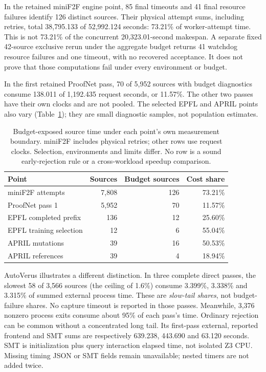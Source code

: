 \documentclass[10pt,twocolumn]{article}
\begin{document}
In the retained miniF2F engine point, 85 final timeouts and 41 final
resource failures identify 126 distinct sources.
Their physical attempt sums, including retries, total 38,795.133 of
52,992.124 seconds: 73.21\% of worker-attempt time.
This is not 73.21\% of the concurrent 20,323.01-second makespan.
A separate fixed 42-source exclusive rerun under the aggregate budget returns
41 watchdog resource failures and one timeout, with no recovered acceptance.
It does not prove that those computations fail under every environment or
budget.

In the first retained ProofNet pass, 70 of 5,952 sources with budget
diagnostics consume 138.011 of 1,192.435 request seconds, or 11.57\%.
The other two passes have their own clocks and are not pooled.
The selected EPFL and APRIL points also vary (Table~\ref{tab:budget});
they are small diagnostic samples, not population estimates.

\begin{table}[t]
\centering\footnotesize
\setlength{\tabcolsep}{3pt}
\begin{tabular}{@{}lrrr@{}}
\toprule
Point & Sources & Budget sources & Cost share\\
\midrule
miniF2F attempts &7,808&126&73.21\%\\
ProofNet pass 1 &5,952&70&11.57\%\\
EPFL completed prefix &136&12&25.60\%\\
EPFL training selection &12&6&55.04\%\\
APRIL mutations &39&16&50.53\%\\
APRIL references &39&4&18.94\%\\
\bottomrule
\end{tabular}
\caption{Budget-exposed source time under each point's own measurement
boundary. miniF2F includes physical retries; other rows use request clocks.
Selection, environments and limits differ. No row is a sound early-rejection
rule or a cross-workload speedup comparison.}
\label{tab:budget}
\end{table}

AutoVerus illustrates a different distinction. In three complete direct
passes, the slowest 58 of 3,566 sources (the ceiling of 1.6\%) consume
3.399\%, 3.338\% and 3.315\% of summed external process time.
These are \emph{slow-tail shares}, not budget-failure shares.
No capture timeout is reported in those passes.
Meanwhile, 3,376 nonzero process exits consume about 95\% of each pass's
time. Ordinary rejection can be common without a concentrated long tail.
Its first-pass external, reported frontend and SMT sums are respectively
639.238, 443.690 and 63.120 seconds. SMT is initialization plus query
interaction elapsed time, not isolated Z3 CPU. Missing timing JSON or SMT
fields remain unavailable; nested timers are not added twice.
\end{document}
